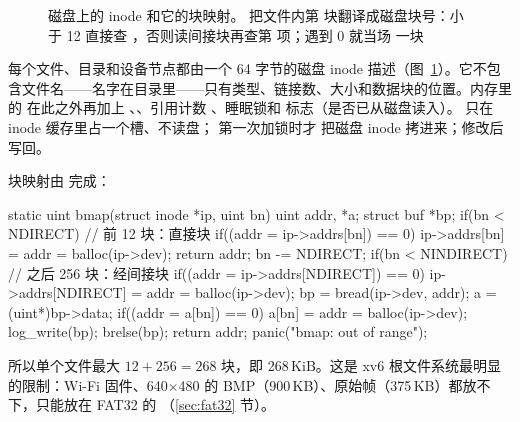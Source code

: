 \begin{figure}[htbp]
  \caption{磁盘上的 inode 和它的块映射。 把文件内第  块翻译成磁盘块号：小于 12 直接查 ，否则读间接块再查第  项；遇到 0 就当场  一块}
  \label{fig:xv6-inode}
\end{figure}

每个文件、目录和设备节点都由一个 64 字节的磁盘 inode 描述（图~\ref{fig:xv6-inode}）。它不包含文件名——名字在目录里——只有类型、链接数、大小和数据块的位置。内存里的  在此之外再加上 、、引用计数 、睡眠锁和  标志（是否已从磁盘读入）。 只在 inode 缓存里占一个槽、不读盘； 第一次加锁时才  把磁盘 inode 拷进来；修改后  写回。

块映射由  完成：

\begin{ccode}
static uint bmap(struct inode *ip, uint bn) {
  uint addr, *a;
  struct buf *bp;
  if(bn < NDIRECT){                                   // 前 12 块：直接块
    if((addr = ip->addrs[bn]) == 0)
      ip->addrs[bn] = addr = balloc(ip->dev);
    return addr;
  }
  bn -= NDIRECT;
  if(bn < NINDIRECT){                                 // 之后 256 块：经间接块
    if((addr = ip->addrs[NDIRECT]) == 0)
      ip->addrs[NDIRECT] = addr = balloc(ip->dev);
    bp = bread(ip->dev, addr);
    a = (uint*)bp->data;
    if((addr = a[bn]) == 0){
      a[bn] = addr = balloc(ip->dev);
      log_write(bp);
    }
    brelse(bp);
    return addr;
  }
  panic("bmap: out of range");
}
\end{ccode}

所以单个文件最大 $12+256=268$ 块，即 268\,KiB。这是 xv6 根文件系统最明显的限制：Wi-Fi 固件、640$\times$480 的 BMP（900\,KB）、原始帧（375\,KB）都放不下，只能放在 FAT32 的 （\ref{sec:fat32} 节）。

